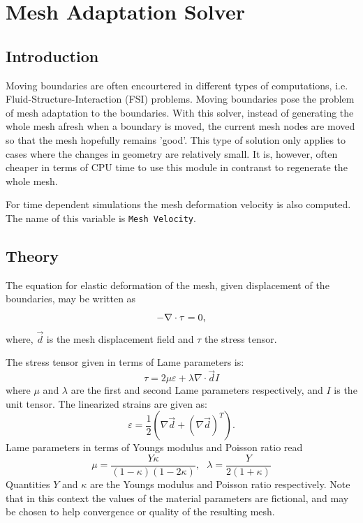 \chapter{Mesh Adaptation Solver}

\begin{versiona}

\section{Introduction}

Moving boundaries are often encourtered in different types of computations,
i.e. Fluid-Structure-Interaction (FSI) problems.
Moving boundaries pose the problem of mesh adaptation to the boundaries.
With this solver, instead of generating the
whole mesh afresh when a boundary is moved, the current mesh nodes are moved
so that the mesh hopefully remains 'good'. This type of solution only applies
to cases where the changes in geometry are relatively small. It is, however, 
often cheaper in terms of CPU time to use this module in contranst to regenerate
the whole mesh.

For time dependent simulations the mesh deformation velocity is also computed.
The name of this variable is {\tt Mesh Velocity}.

\section{Theory}

The equation for elastic deformation of the mesh, given displacement of the boundaries,
may be written as
\begin{equation}
-\nabla\cdot {\bf \tau} = 0,
\end{equation}
where, $\Vec{d}$ is the mesh displacement field and $\tau$ the stress tensor.

The stress tensor given in terms of Lame parameters is:
\begin{equation}
\tau = 2 \mu \varepsilon + \lambda\nabla\cdot\Vec{d} I
\end{equation}
where $\mu$ and $\lambda$ are the first and second Lame parameters respectively,
and $I$ is the unit tensor.
The linearized strains are given as:
\begin{equation}
\varepsilon = \frac{1}{2}(\nabla{\Vec{d}} + (\nabla{\Vec{d}})^T).
\end{equation}
Lame parameters in terms of Youngs modulus and
Poisson ratio read
\begin{equation}
 \mu = \frac{Y \kappa}{( 1 - \kappa ) ( 1-2\kappa )},\ \ \  
 \lambda = \frac{Y}{2(1+\kappa)}
\end{equation}
Quantities $Y$ and $\kappa$ are the Youngs modulus and Poisson ratio respectively.
Note that in this context the values of the material parameters are fictional, and may
be chosen to help convergence or quality of the resulting mesh.



\end{versiona}
